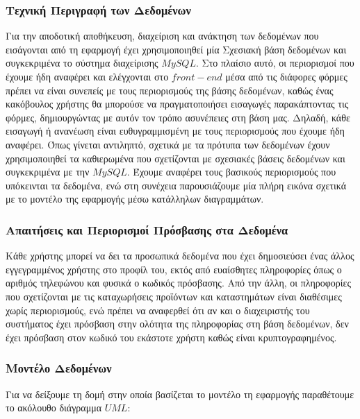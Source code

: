 \documentclass[12pt]{article}
\begin{document}
\subsubsection{Τεχνική Περιγραφή των Δεδομένων}

Για την αποδοτική αποθήκευση, διαχείριση  και ανάκτηση των δεδομένων που εισάγονται από τη εφαρμογή έχει χρησιμοποιηθεί μία Σχεσιακή βάση δεδομένων και συγκεκριμένα το σύστημα διαχείρισης $MySQL$. Στο πλαίσιο αυτό, οι περιορισμοί που έχουμε ήδη αναφέρει και ελέγχονται στο $front-end$ μέσα από τις διάφορες φόρμες πρέπει να είναι συνεπείς με τους περιορισμούς της βάσης δεδομένων, καθώς ένας κακόβουλος χρήστης θα μπορούσε να πραγματοποιήσει εισαγωγές παρακάπτοντας τις φόρμες, δημιουργώντας με αυτόν τον τρόπο ασυνέπειες στη βάση μας. Δηλαδή, κάθε εισαγωγή ή ανανέωση είναι ευθυγραμμισμένη με τους περιορισμούς που έχουμε ήδη αναφέρει. Όπως γίνεται αντιληπτό, σχετικά με τα πρότυπα των δεδομένων έχουν χρησιμοποιηθεί τα καθιερωμένα που σχετίζονται με σχεσιακές βάσεις δεδομένων και συγκεκριμένα με την $MySQL$. Έχουμε αναφέρει τους βασικούς περιορισμούς που υπόκεινται τα δεδομένα, ενώ στη συνέχεια παρουσιάζουμε μία πλήρη εικόνα σχετικά με το μοντέλο της εφαρμογής μέσω κατάλληλων διαγραμμάτων.

\subsubsection{Απαιτήσεις και Περιορισμοί Πρόσβασης στα Δεδομένα}

Κάθε χρήστης μπορεί να δει τα προσωπικά δεδομένα που έχει δημοσιεύσει ένας άλλος εγγεγραμμένος χρήστης στο προφίλ του, εκτός από ευαίσθητες πληροφορίες όπως ο αριθμός τηλεφώνου και φυσικά ο κωδικός πρόσβασης. Από την άλλη, οι πληροφορίες που σχετίζονται με τις καταχωρήσεις προϊόντων και καταστημάτων είναι διαθέσιμες χωρίς περιορισμούς, ενώ πρέπει να αναφερθεί ότι αν και ο διαχειριστής του συστήματος έχει πρόσβαση στην ολότητα της πληροφορίας στη βάση δεδομένων, δεν έχει πρόσβαση στον κωδικό του εκάστοτε χρήστη καθώς είναι κρυπτογραφημένος.

\subsubsection{Μοντέλο Δεδομένων}

Για να δείξουμε τη δομή στην οποία βασίζεται το μοντέλο τη εφαρμογής παραθέτουμε το ακόλουθο διάγραμμα $UML$:
\end{document}
